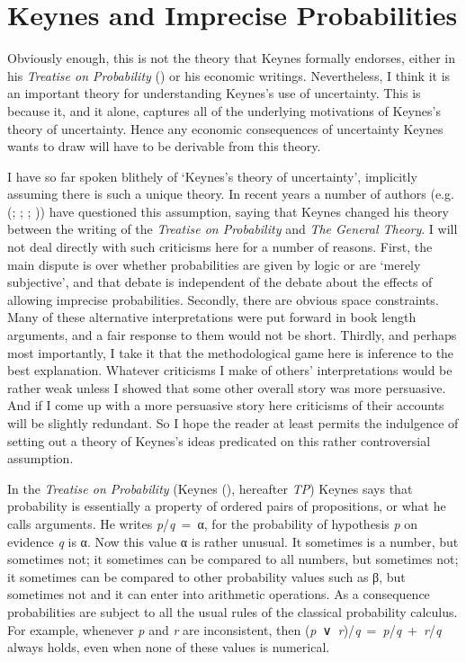 \documentclass[
  10pt,
  letterpaper,
  DIV=11,
  numbers=noendperiod,
  twoside]{scrartcl}
\begin{document}
\section{Keynes and Imprecise
Probabilities}\label{keynes-and-imprecise-probabilities}

Obviously enough, this is not the theory that Keynes formally endorses,
either in his \emph{Treatise on Probability}
() or his economic writings.
Nevertheless, I think it is an important theory for understanding
Keynes's use of uncertainty. This is because it, and it alone, captures
all of the underlying motivations of Keynes's theory of uncertainty.
Hence any economic consequences of uncertainty Keynes wants to draw will
have to be derivable from this theory.

I have so far spoken blithely of `Keynes's theory of uncertainty',
implicitly assuming there is such a unique theory. In recent years a
number of authors (e.g. (;
; ; )) have questioned this
assumption, saying that Keynes changed his theory between the writing of
the \emph{Treatise on Probability} and \emph{The General Theory}. I will
not deal directly with such criticisms here for a number of reasons.
First, the main dispute is over whether probabilities are given by logic
or are `merely subjective', and that debate is independent of the debate
about the effects of allowing imprecise probabilities. Secondly, there
are obvious space constraints. Many of these alternative interpretations
were put forward in book length arguments, and a fair response to them
would not be short. Thirdly, and perhaps most importantly, I take it
that the methodological game here is inference to the best explanation.
Whatever criticisms I make of others' interpretations would be rather
weak unless I showed that some other overall story was more persuasive.
And if I come up with a more persuasive story here criticisms of their
accounts will be slightly redundant. So I hope the reader at least
permits the indulgence of setting out a theory of Keynes's ideas
predicated on this rather controversial assumption.

In the \emph{Treatise on Probability} (Keynes
(), hereafter \emph{TP}) Keynes says that
probability is essentially a property of ordered pairs of propositions,
or what he calls arguments. He writes \emph{p}/\emph{q}~=~α, for the
probability of hypothesis \emph{p} on evidence \emph{q} is α. Now this
value α is rather unusual. It sometimes is a number, but sometimes not;
it sometimes can be compared to all numbers, but sometimes not; it
sometimes can be compared to other probability values such as β, but
sometimes not and it can enter into arithmetic operations. As a
consequence probabilities are subject to all the usual rules of the
classical probability calculus. For example, whenever \emph{p} and
\emph{r} are inconsistent, then
(\emph{p}~∨~\emph{r})/\emph{q}~=~\emph{p}/\emph{q}~+~\emph{r}/\emph{q}
always holds, even when none of these values is numerical.
\end{document}
